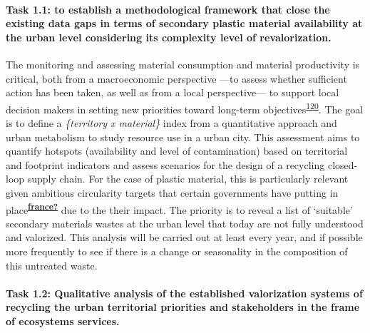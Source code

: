\documentclass[
  12pt,
  a4paperpaper,
  onecolumn]{article}
\let\oldparagraph\paragraph
\renewcommand{\paragraph}[1]{\oldparagraph{#1}\mbox{}}
\let\paragraph\oldparagraph
\begin{document}
\hypertarget{task-1.1-to-establish-a-methodological-framework-that-close-the-existing-data-gaps-in-terms-of-secondary-plastic-material-availability-at-the-urban-level-considering-its-complexity-level-of-revalorization.}{%
\paragraph{Task 1.1: to establish a methodological framework that close
the existing data gaps in terms of secondary plastic material
availability at the urban level considering its complexity level of
revalorization.}\label{task-1.1-to-establish-a-methodological-framework-that-close-the-existing-data-gaps-in-terms-of-secondary-plastic-material-availability-at-the-urban-level-considering-its-complexity-level-of-revalorization.}}

The monitoring and assessing material consumption and material
productivity is critical, both from a macroeconomic perspective ---to
assess whether sufficient action has been taken, as well as from a local
perspective--- to support local decision makers in setting new
priorities toward long-term
objectives\textsuperscript{\protect\hyperlink{ref-Bianchi2020}{120}}.
The goal is to define a \emph{\{territory x material\}} index from a
quantitative approach and urban metabolism to study resource use in a
urban city. This assessment aims to quantify hotspots (availability and
level of contamination) based on territorial and footprint indicators
and assess scenarios for the design of a recycling closed-loop supply
chain. For the case of plastic material, this is particularly relevant
given ambitious circularity targets that certain governments have
putting in
place\textsuperscript{\protect\hyperlink{ref-france}{\textbf{france?}}}
due to the their impact. The priority is to reveal a list of `suitable'
secondary materials wastes at the urban level that today are not fully
understood and valorized. This analysis will be carried out at least
every year, and if possible more frequently to see if there is a change
or seasonality in the composition of this untreated waste.

\hypertarget{task-1.2-qualitative-analysis-of-the-established-valorization-systems-of-recycling-the-urban-territorial-priorities-and-stakeholders-in-the-frame-of-ecosystems-services.}{%
\paragraph{Task 1.2: Qualitative analysis of the established
valorization systems of recycling the urban territorial priorities and
stakeholders in the frame of ecosystems
services.}\label{task-1.2-qualitative-analysis-of-the-established-valorization-systems-of-recycling-the-urban-territorial-priorities-and-stakeholders-in-the-frame-of-ecosystems-services.}}
\end{document}
